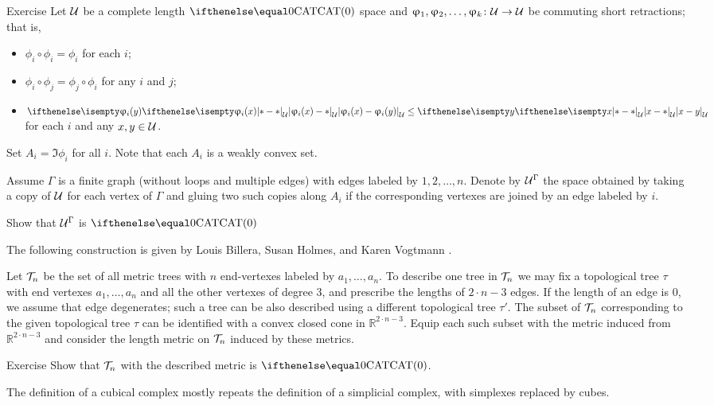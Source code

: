 \begin{thm}{Exercise}\label{ex:short+commuting}
Let $\mathcal{U}$ be a complete length $\CAT0$ space
and $\phi_1,\phi_2,\dots,\phi_k\:\spc{U}\to \spc{U}$ be commuting short retractions; 
that is, 
\begin{itemize}
\item $\phi_i\circ\phi_i=\phi_i$ for each $i$;
\item $\phi_i\circ\phi_j=\phi_j\circ\phi_i$ for any $i$ and $j$;
\item $\dist{\phi_i(x)}{\phi_i(y)}{\spc{U}}\le \dist{x}{y}{\spc{U}}$ for each $i$ and any $x,y\in\spc{U}$.
\end{itemize}
Set $A_i=\Im \phi_i$ for all $i$.
Note that each $A_i$ is a weakly convex set.

Assume $\Gamma$ is a finite graph 
(without loops and multiple edges) 
with edges labeled by $1,2,\dots, n$.
Denote by $\mathcal{U}^\Gamma$ the space obtained by taking 
a copy of $\mathcal{U}$ for each vertex of $\Gamma$ and 
gluing two such copies along $A_i$ if the corresponding vertexes are joined by an edge labeled by $i$.

Show that $\mathcal{U}^\Gamma$ is $\CAT0$
\end{thm}

The following construction is given by 
Louis Billera,
Susan Holmes,
and  Karen Vogtmann \cite{billera-holmes-vogtmann}.

Let $\mathcal{T}_n$ be the set of all metric trees with $n$ end-vertexes
labeled by $a_1,\dots,a_n$.
To describe one tree in $\mathcal{T}_n$ we may fix a topological tree $\tau$ with end vertexes $a_1,\dots,a_n$ and all the other vertexes of degree 3,  
and prescribe the lengths of $2\cdot n-3$ edges.
If the length of an edge is $0$, we assume that edge degenerates;
such a tree can be also described using a different topological tree $\tau'$.
The subset of $\mathcal{T}_n$ corresponding to the given topological tree $\tau$ can be identified with a convex closed cone in  $\mathbb{R}^{2\cdot n-3}$.
Equip each such subset with the metric induced from $\mathbb{R}^{2\cdot n-3}$ and consider the length metric on $\mathcal{T}_n$ induced by these metrics.

\begin{thm}{Exercise}\label{ex:space-of-trees}
Show that $\mathcal{T}_n$ with the described metric is $\CAT0$.
\end{thm}



The definition of a cubical complex
mostly repeats the definition of a simplicial complex, 
with simplexes replaced by cubes.

